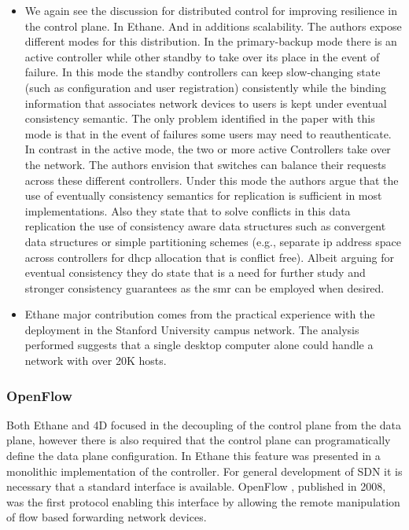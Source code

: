 \begin{itemize}
\begin{itemize}
\item We again see the discussion  for distributed control for improving resilience in the control plane.
In Ethane.
And in additions scalability.
The authors expose different modes for this distribution. In the primary-backup mode there is an active controller while other standby to take over its place in the event of failure. 
In this mode the standby controllers can keep slow-changing state (such as configuration and user registration) consistently while the binding information that associates network devices to users is kept under eventual consistency semantic. The only problem identified in the paper with this mode is that in the event of failures some users may need to reauthenticate. 
In contrast in the active mode, the two or more active Controllers take over the network. The authors envision that switches can balance their requests across these different controllers. Under this mode the authors argue that  the use of eventually consistency semantics for replication is sufficient in most implementations. Also they state that to solve conflicts in this data replication the use of consistency aware data structures such as convergent data structures or simple partitioning schemes (e.g., separate \gls{ip} address space across controllers for \gls{dhcp} allocation that is conflict free). Albeit arguing for eventual consistency they do state that is a need for further study and stronger consistency guarantees as the \gls{smr} can be employed when desired. 

\item Ethane major contribution comes from the practical  experience with
the deployment in the Stanford
University  campus network. The  analysis performed suggests that a single
desktop computer alone could handle a network with over 20K hosts. 

\end{itemize}


\subsubsection{OpenFlow}
Both Ethane \cite{Casado:2007kb} and 4D \cite{Greenberg:2005boa}
focused in the decoupling of the control plane from the data plane, however there is also required that the control plane can programatically define the data plane configuration. In Ethane this
feature was presented in a monolithic  implementation of the controller.
For general development of SDN  it is  necessary that a
standard interface is available. OpenFlow \cite{openflow}, published
in 2008,  was the first protocol enabling this interface by allowing
the remote manipulation of flow based forwarding network devices. 


\end{itemize}
